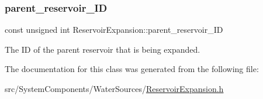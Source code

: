 \subsubsection{\texorpdfstring{parent\+\_\+reservoir\+\_\+\+ID}{parent\_reservoir\_ID}}
{\footnotesize\ttfamily const unsigned int Reservoir\+Expansion\+::parent\+\_\+reservoir\+\_\+\+ID}



The ID of the parent reservoir that is being expanded. 



The documentation for this class was generated from the following file\+:\begin{DoxyCompactItemize}
\item 
src/\+System\+Components/\+Water\+Sources/\mbox{\hyperlink{ReservoirExpansion_8h}{Reservoir\+Expansion.\+h}}\end{DoxyCompactItemize}
